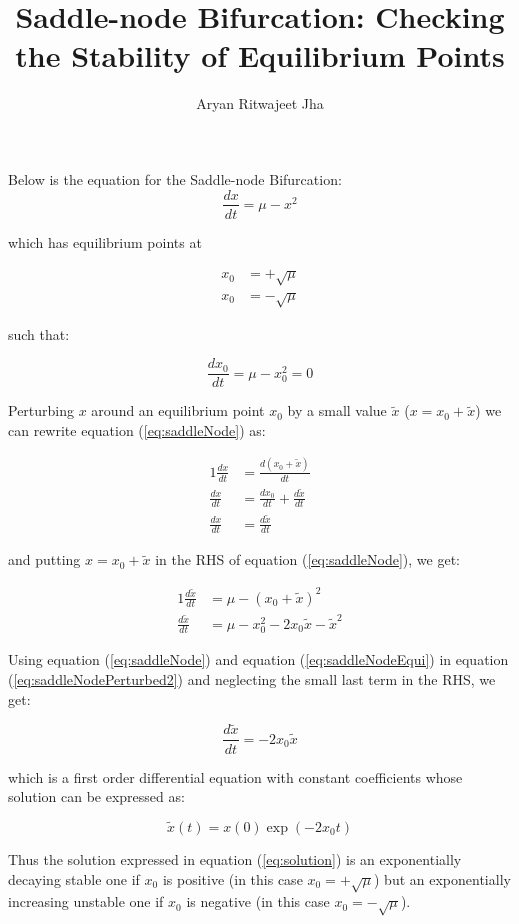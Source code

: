 \documentclass{article}
\begin{document}
	\title{Saddle-node Bifurcation: Checking the Stability of Equilibrium Points}
	\author{Aryan Ritwajeet Jha}
	\maketitle
	
Below is the equation for the Saddle-node Bifurcation: 
	\begin{equation}
		\label{eq:saddleNode}
		\frac{dx}{dt} = \mu - x^2
	\end{equation}
	
which has equilibrium points at
	
	\begin{align*}
		x_0 &= +\sqrt\mu \\
		x_0 &= -\sqrt\mu
	\end{align*} 

such that:
	
	\begin{equation}
		\label{eq:saddleNodeEqui}
		\frac{dx_0}{dt} = \mu - x_0^2 = 0 
	\end{equation}
	
	
Perturbing $x$ around an equilibrium point $x_0$ by a small value $\tilde x$ ($x = x_0 + \tilde x$) we can rewrite equation (\ref{eq:saddleNode}) as:
	
	\begin{alignat}{1}
		\label{eq:saddleNodePerturbed}
		\frac{dx}{dt} &= \frac{d(x_0 + \tilde x)}{dt} \\
		\frac{dx}{dt} &= \frac{dx_0}{dt} + \frac{d \tilde x}{dt} \\
		\frac{dx}{dt} &= \frac{d \tilde x}{dt} 
	\end{alignat}

and putting $x = x_0 + \tilde x$ in the RHS of equation (\ref{eq:saddleNode}), we get:
	
	\begin{alignat}{1}
		\label{eq:saddleNodePerturbed2}
		\frac{d\tilde x}{dt} &= \mu - (x_0+\tilde x)^2 \\
		\frac{d\tilde x}{dt} &= \mu - x_0^2 -2x_0\tilde x - \tilde x^2
	\end{alignat}
	
Using equation (\ref{eq:saddleNode}) and equation (\ref{eq:saddleNodeEqui}) in equation (\ref{eq:saddleNodePerturbed2}) and neglecting the small last term in the RHS, we get:
	
	\begin{equation}
		\frac{d\tilde x}{dt} = -2x_0\tilde x
	\end{equation}

which is a first order differential equation with constant coefficients whose solution can be expressed as:

	\begin{equation}
		\label{eq:solution}
		\tilde{x}(t) = x(0)\exp{(-2x_0t)} 
	\end{equation}

Thus the solution expressed in equation (\ref{eq:solution}) is an exponentially decaying stable one if $x_0$ is positive (in this case $x_0 = +\sqrt{\mu}$) but an exponentially increasing unstable one if $x_0$ is negative (in this case $x_0 = -\sqrt{\mu}$).
\end{document}
